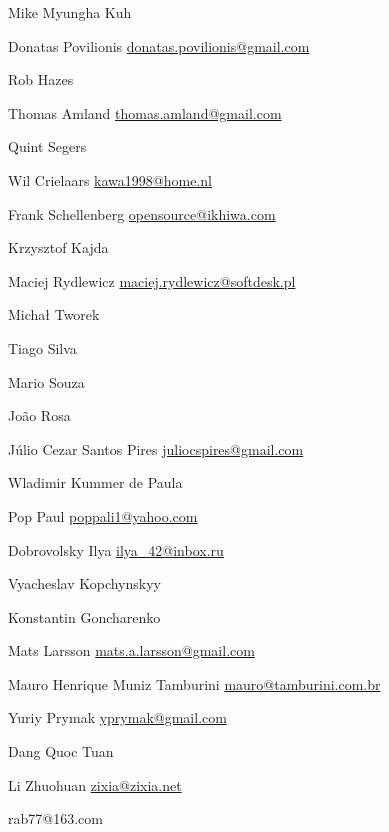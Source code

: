 \item Mike Myungha Kuh
\item Donatas Povilionis \url{donatas.povilionis@gmail.com}
\item Rob Hazes
\item Thomas Amland \url{thomas.amland@gmail.com}
\item Quint Segers
\item Wil Crielaars \url{kawa1998@home.nl}
\item Frank Schellenberg \url{opensource@ikhiwa.com}
\item Krzysztof Kajda
\item Maciej Rydlewicz \url{maciej.rydlewicz@softdesk.pl}
\item Michał Tworek
\item Tiago Silva
\item Mario Souza
\item*João Rosa
\item J\'ulio Cezar Santos Pires \url{juliocspires@gmail.com}
\item Wladimir Kummer de Paula
\item Pop Paul \url{poppali1@yahoo.com}
\item Dobrovolsky Ilya \url{ilya_42@inbox.ru}
\item*Vyacheslav Kopchynskyy
\item*Konstantin Goncharenko
\item Mats Larsson \url{mats.a.larsson@gmail.com}
\item Mauro Henrique Muniz Tamburini \url {mauro@tamburini.com.br}
\item Yuriy Prymak \url{yprymak@gmail.com}
\item*Dang Quoc Tuan
\item Li Zhuohuan \url{zixia@zixia.net}
\item rab77@163.com
